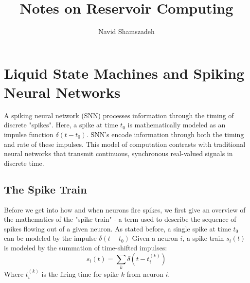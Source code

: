 \documentclass[11pt]{article}
\theoremstyle{definition}
\theoremstyle{remark}
\begin{document}
    
    
   \title{Notes on Reservoir Computing}
   \author{Navid Shamszadeh}
   \maketitle
   \tableofcontents
   \newpage
    \section{Liquid State Machines and Spiking Neural Networks}
    A spiking neural network (SNN) processes information through the timing of discrete "spikes". Here, a spike at time $t_0$ is mathematically modeled as an impulse function $\delta(t - t_0)$. SNN's encode information through both the timing and rate of these impulses. This model of computation contrasts with traditional neural networks that transmit continuous, synchronous real-valued signals in discrete time.
    \subsection{The Spike Train}
    Before we get into how and when neurons fire spikes, we first give an overview of the mathematics of the "spike train" - a term used to describe the sequence of spikes flowing out of a given neuron. As stated before, a single spike at time $t_0$ can be modeled by the impulse $\delta(t-t_0)$ Given a neuron $i$, a spike train $s_i(t)$ is modeled by the summation of time-shifted impulses:
    \begin{equation}\label{eqn:3}
    s_i(t) = \sum_{k}\delta\left(t-t_i^{(k)}\right)
    \end{equation}
    Where $t_i^{(k)}$ is the firing time for spike $k$ from neuron $i$.
\end{document}
